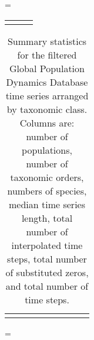 \LTcapwidth=\textwidth
\begin{footnotesize}
\begin{longtable}{>{\RaggedRight}m{3.2cm}>{\RaggedRight}p{6.5cm}>{\RaggedRight}p{5.0cm}}
\toprule

\label{tab:phylopic}
\end{longtable}
\end{footnotesize}


% 
% 
%

\clearpage

\begin{table}
\begin{footnotesize}

\caption[Summary statistics for the filtered Global Population Dynamics
  Database time series arranged by taxonomic class.]{Summary statistics for the filtered Global Population Dynamics
  Database time series arranged by taxonomic class. Columns are: number of
  populations, number of taxonomic orders, numbers of species, median time
  series length, total number of interpolated time steps, total number of
  substituted zeros, and total number of time steps.}

\smallskip
\begin{tabular}{lrrrrrrrr}
\toprule

\label{tab:stats}
\end{tabular}
\end{footnotesize}
\end{table}

\clearpage

\LTcapwidth=\textwidth
{}

